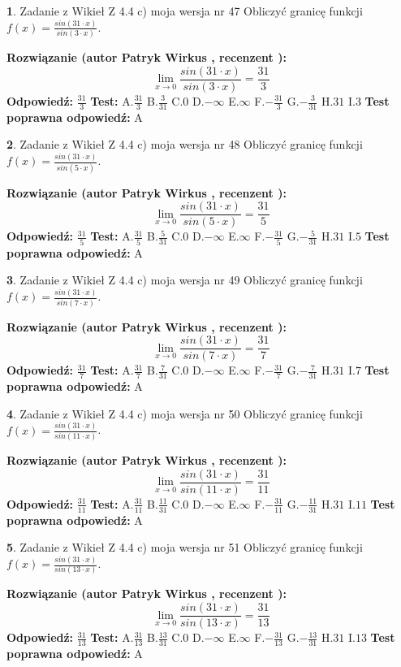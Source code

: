\documentclass[12pt, a4paper]{article}
\theoremstyle{definition} %
\newtheorem{zad}{}
\newcommand{\zadStart}[1]{\begin{zad}#1\newline}
\newcommand{\zadStop}{\end{zad}}
\newcommand{\rozwStart}[2]{\noindent \textbf{Rozwiązanie (autor #1 , recenzent #2): }\newline}
\newcommand{\rozwStop}{\newline}
\newcommand{\odpStart}{\noindent \textbf{Odpowiedź:}\newline}
\newcommand{\odpStop}{\newline}
\newcommand{\testStart}{\noindent \textbf{Test:}\newline}
\newcommand{\testStop}{\newline}
\newcommand{\kluczStart}{\noindent \textbf{Test poprawna odpowiedź:}\newline}
\newcommand{\kluczStop}{\newline}
\begin{document}
\zadStart{Zadanie z Wikieł Z 4.4 c) moja wersja nr 47}
Obliczyć granicę funkcji $f(x)=\frac{sin(31\cdot x)}{sin(3\cdot x)}$.
\zadStop
\rozwStart{Patryk Wirkus}{}
$$\lim\limits_{x\to 0}\frac{sin(31\cdot x)}{sin(3\cdot x)}=
\frac{31}{3}$$
\rozwStop
\odpStart
$\frac{31}{3}$
\odpStop
\testStart
A.$\frac{31}{3}$
B.$\frac{3}{31}$
C.$0$
D.$-\infty$
E.$\infty$
F.$-\frac{31}{3}$
G.$-\frac{3}{31}$
H.$31$
I.$3$
\testStop
\kluczStart
A
\kluczStop



\zadStart{Zadanie z Wikieł Z 4.4 c) moja wersja nr 48}
Obliczyć granicę funkcji $f(x)=\frac{sin(31\cdot x)}{sin(5\cdot x)}$.
\zadStop
\rozwStart{Patryk Wirkus}{}
$$\lim\limits_{x\to 0}\frac{sin(31\cdot x)}{sin(5\cdot x)}=
\frac{31}{5}$$
\rozwStop
\odpStart
$\frac{31}{5}$
\odpStop
\testStart
A.$\frac{31}{5}$
B.$\frac{5}{31}$
C.$0$
D.$-\infty$
E.$\infty$
F.$-\frac{31}{5}$
G.$-\frac{5}{31}$
H.$31$
I.$5$
\testStop
\kluczStart
A
\kluczStop



\zadStart{Zadanie z Wikieł Z 4.4 c) moja wersja nr 49}
Obliczyć granicę funkcji $f(x)=\frac{sin(31\cdot x)}{sin(7\cdot x)}$.
\zadStop
\rozwStart{Patryk Wirkus}{}
$$\lim\limits_{x\to 0}\frac{sin(31\cdot x)}{sin(7\cdot x)}=
\frac{31}{7}$$
\rozwStop
\odpStart
$\frac{31}{7}$
\odpStop
\testStart
A.$\frac{31}{7}$
B.$\frac{7}{31}$
C.$0$
D.$-\infty$
E.$\infty$
F.$-\frac{31}{7}$
G.$-\frac{7}{31}$
H.$31$
I.$7$
\testStop
\kluczStart
A
\kluczStop



\zadStart{Zadanie z Wikieł Z 4.4 c) moja wersja nr 50}
Obliczyć granicę funkcji $f(x)=\frac{sin(31\cdot x)}{sin(11\cdot x)}$.
\zadStop
\rozwStart{Patryk Wirkus}{}
$$\lim\limits_{x\to 0}\frac{sin(31\cdot x)}{sin(11\cdot x)}=
\frac{31}{11}$$
\rozwStop
\odpStart
$\frac{31}{11}$
\odpStop
\testStart
A.$\frac{31}{11}$
B.$\frac{11}{31}$
C.$0$
D.$-\infty$
E.$\infty$
F.$-\frac{31}{11}$
G.$-\frac{11}{31}$
H.$31$
I.$11$
\testStop
\kluczStart
A
\kluczStop



\zadStart{Zadanie z Wikieł Z 4.4 c) moja wersja nr 51}
Obliczyć granicę funkcji $f(x)=\frac{sin(31\cdot x)}{sin(13\cdot x)}$.
\zadStop
\rozwStart{Patryk Wirkus}{}
$$\lim\limits_{x\to 0}\frac{sin(31\cdot x)}{sin(13\cdot x)}=
\frac{31}{13}$$
\rozwStop
\odpStart
$\frac{31}{13}$
\odpStop
\testStart
A.$\frac{31}{13}$
B.$\frac{13}{31}$
C.$0$
D.$-\infty$
E.$\infty$
F.$-\frac{31}{13}$
G.$-\frac{13}{31}$
H.$31$
I.$13$
\testStop
\kluczStart
A
\kluczStop
\end{document}
